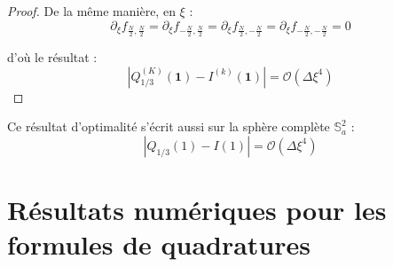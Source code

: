 \begin{proof}
De la même manière, en $\xi$ :
\begin{equation}
\partial_{\xi} f_{\frac{N}{2},\frac{N}{2}} = \partial_{\xi} f_{-\frac{N}{2},\frac{N}{2}} = \partial_{\xi} f_{\frac{N}{2},-\frac{N}{2}} = \partial_{\xi} f_{-\frac{N}{2},-\frac{N}{2}} = 0 
\end{equation}

d'où le résultat :
\begin{equation}
|Q_{1/3}^{(K)}(\mathbf{1}) - I^{(k)}(\mathbf{1}) | = \mathcal{O}\left( \Delta \xi^4 \right)
\end{equation}
\end{proof}

Ce résultat d'optimalité s'écrit aussi sur la sphère complète $\mathbb{S}_a^2$ :
\begin{equation}
|Q_{1/3}(1) - I(1) | = \mathcal{O}\left( \Delta \xi^4 \right)
\end{equation}
























\section{Résultats numériques pour les formules de quadratures}

